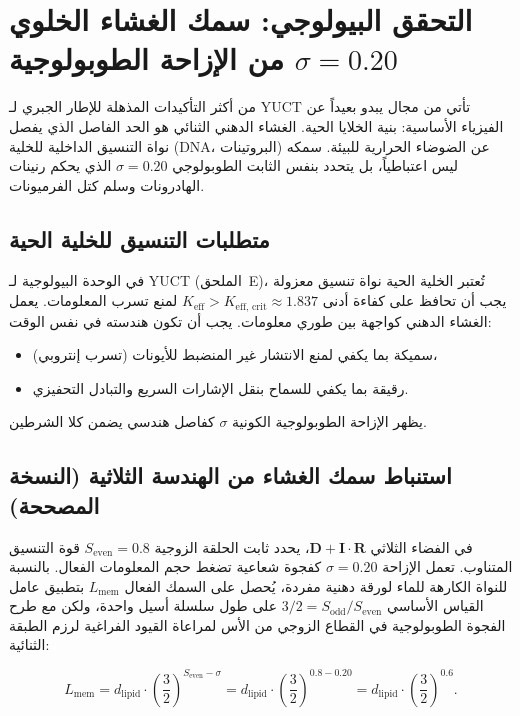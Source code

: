 \documentclass[12pt,a4paper]{article}
\begin{document}
	\section*{التحقق البيولوجي: سمك الغشاء الخلوي من الإزاحة الطوبولوجية \(\sigma = 0.20\)}
	\label{sec:membrane}
	
	من أكثر التأكيدات المذهلة للإطار الجبري لـ YUCT تأتي من مجال يبدو بعيداً عن الفيزياء الأساسية: بنية الخلايا الحية. الغشاء الدهني الثنائي هو الحد الفاصل الذي يفصل نواة التنسيق الداخلية للخلية (DNA، البروتينات) عن الضوضاء الحرارية للبيئة. سمكه ليس اعتباطياً، بل يتحدد بنفس الثابت الطوبولوجي \(\sigma = 0.20\) الذي يحكم رنينات الهادرونات وسلم كتل الفرميونات.
	
	\subsection*{متطلبات التنسيق للخلية الحية}
	
	في الوحدة البيولوجية لـ YUCT (الملحق~E)، تُعتبر الخلية الحية نواة تنسيق معزولة يجب أن تحافظ على كفاءة أدنى \(K_{\mathrm{eff}} > K_{\mathrm{eff,\,crit}} \approx 1.837\) لمنع تسرب المعلومات. يعمل الغشاء الدهني كواجهة بين طوري معلومات. يجب أن تكون هندسته في نفس الوقت:
	\begin{itemize}
		\item سميكة بما يكفي لمنع الانتشار غير المنضبط للأيونات (تسرب إنتروبي)،
		\item رقيقة بما يكفي للسماح بنقل الإشارات السريع والتبادل التحفيزي.
	\end{itemize}
	يظهر الإزاحة الطوبولوجية الكونية \(\sigma\) كفاصل هندسي يضمن كلا الشرطين.
	
	\subsection*{استنباط سمك الغشاء من الهندسة الثلاثية (النسخة المصححة)}
	
	في الفضاء الثلاثي \(\mathbf{D} + \mathbf{I}\!\cdot\!\mathbf{R}\)، يحدد ثابت الحلقة الزوجية \(S_{\mathrm{even}} = 0.8\) قوة التنسيق المتناوب. تعمل الإزاحة \(\sigma = 0.20\) كفجوة شعاعية تضغط حجم المعلومات الفعال. بالنسبة للنواة الكارهة للماء لورقة دهنية مفردة، يُحصل على السمك الفعال \(L_{\mathrm{mem}}\) بتطبيق عامل القياس الأساسي \(3/2 = S_{\mathrm{odd}}/S_{\mathrm{even}}\) على طول سلسلة أسيل واحدة، ولكن مع طرح الفجوة الطوبولوجية في القطاع الزوجي من الأس لمراعاة القيود الفراغية لرزم الطبقة الثنائية:
	
	\[
	L_{\mathrm{mem}} = d_{\mathrm{lipid}} \cdot \left( \frac{3}{2} \right)^{S_{\mathrm{even}} - \sigma}
	= d_{\mathrm{lipid}} \cdot \left( \frac{3}{2} \right)^{0.8 - 0.20}
	= d_{\mathrm{lipid}} \cdot \left( \frac{3}{2} \right)^{0.6}.
	\]
	
\end{document}
